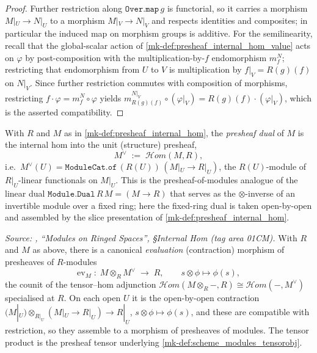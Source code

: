 \begin{proof}
  \leanok
  Further restriction along \(\mathtt{Over.map}\,g\) is functorial, so it carries a
  morphism \(M|_U \to N|_U\) to a morphism \(M|_V \to N|_V\) and respects identities and
  composites; in particular the induced map on morphism groups is additive. For the
  semilinearity, recall that the global-scalar action of
  \ref{mk-def:presheaf_internal_hom_value} acts on \(\varphi\) by post-composition with
  the multiplication-by-\(f\) endomorphism \(m_f^{N}\); restricting that endomorphism
  from \(U\) to \(V\) is multiplication by \(f|_V = R(g)(f)\) on \(N|_V\). Since further
  restriction commutes with composition of morphisms, restricting \(f \cdot \varphi =
  m_f^{N} \circ \varphi\) yields \(m_{R(g)(f)}^{N|_V} \circ (\varphi|_V) = R(g)(f) \cdot
  (\varphi|_V)\), which is the asserted compatibility.
\end{proof}

\begin{definition}\label{mk-def:presheaf_dual}
  \leanok

  With \(R\) and \(M\) as in \ref{mk-def:presheaf_internal_hom}, the
  \emph{presheaf dual} of \(M\) is the internal hom into the unit (structure)
  presheaf,
  \[
    M^\vee \;:=\; \mathcal{H}om(M, R),
  \]
  i.e.\ \(M^\vee(U) = \mathtt{ModuleCat.of}\,(R(U))\,(M|_U \to R|_U)\), the
  \(R(U)\)-module of \(R|_U\)-linear functionals on \(M|_U\). This is the
  presheaf-of-modules analogue of the linear dual
  \(\mathtt{Module.Dual}\,R\,M = (M \to R)\) that serves as the \(\otimes\)-inverse of
  an invertible module over a fixed ring; here the fixed-ring dual is taken
  open-by-open and assembled by the slice presentation of
  \ref{mk-def:presheaf_internal_hom}.
\end{definition}

\begin{lemma}\label{mk-lem:internal_hom_eval}
  \leanok

  \textit{Source: \cite{stacks-project}, ``Modules on Ringed Spaces'', \S Internal Hom
  (tag area 01CM).}
  With \(R\) and \(M\) as above, there is a canonical \emph{evaluation} (contraction)
  morphism of presheaves of \(R\)-modules
  \[
    \mathrm{ev}_M \;\colon\; M \otimes_R M^\vee \;\longrightarrow\; R,
    \qquad s \otimes \phi \longmapsto \phi(s),
  \]
  the counit of the tensor--hom adjunction
  \(\mathcal{H}om(M \otimes_R -, R) \cong \mathcal{H}om(-, M^\vee)\) specialised at
  \(R\). On each open \(U\) it is the open-by-open contraction
  \((M|_U) \otimes_{R|_U} (M|_U \to R|_U) \to R|_U\), \(s \otimes \phi \mapsto
  \phi(s)\), and these are compatible with restriction, so they assemble to a morphism
  of presheaves of modules. The tensor product is the presheaf tensor underlying
  \ref{mk-def:scheme_modules_tensorobj}.
\end{lemma}

